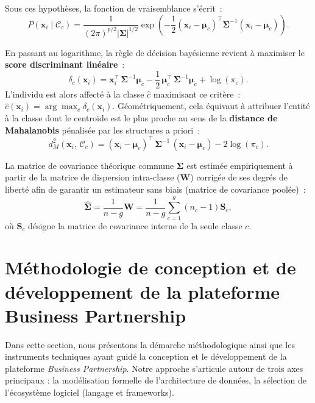 \documentclass[12pt, a4paper, oneside]{report}
\begin{document}
	Sous ces hypothèses, la fonction de vraisemblance s'écrit~:
	\begin{equation}
		P(\mathbf{x}_i \mid \mathcal{C}_c) = \frac{1}{(2\pi)^{p/2}|\boldsymbol{\Sigma}|^{1/2}} \exp\!\left( -\frac{1}{2} (\mathbf{x}_i - \boldsymbol{\mu}_c)^{\top} \boldsymbol{\Sigma}^{-1} (\mathbf{x}_i - \boldsymbol{\mu}_c) \right).
		\label{eq:vraisemblance}
	\end{equation}
	
	En passant au logarithme, la règle de décision bayésienne revient à maximiser le \textbf{score discriminant linéaire}~:
	\begin{equation}
		\delta_c(\mathbf{x}_i) = \mathbf{x}_i^{\top}\,\boldsymbol{\Sigma}^{-1}\boldsymbol{\mu}_c - \frac{1}{2}\,\boldsymbol{\mu}_c^{\top}\,\boldsymbol{\Sigma}^{-1}\boldsymbol{\mu}_c + \log(\pi_c).
		\label{eq:score_bayes}
	\end{equation}
	L'individu est alors affecté à la classe $\hat{c}$ maximisant ce critère~: $\hat{c}(\mathbf{x}_i) = \arg\max_{c} \delta_c(\mathbf{x}_i)$. Géométriquement, cela équivaut à attribuer l'entité à la classe dont le centroïde est le plus proche au sens de la \textbf{distance de Mahalanobis} pénalisée par les structures a priori~:
	\begin{equation}
		d_M^2(\mathbf{x}_i,\, \mathcal{C}_c) = (\mathbf{x}_i - \boldsymbol{\mu}_c)^{\top}\,\boldsymbol{\Sigma}^{-1}\,(\mathbf{x}_i - \boldsymbol{\mu}_c) - 2\log(\pi_c).
		\label{eq:mahalanobis}
	\end{equation}
	
	La matrice de covariance théorique commune $\boldsymbol{\Sigma}$ est estimée empiriquement à partir de la matrice de dispersion intra-classe ($\mathbf{W}$) corrigée de ses degrés de liberté afin de garantir un estimateur sans biais (matrice de covariance poolée)~:
	\begin{equation}
		\hat{\boldsymbol{\Sigma}} = \frac{1}{n - g} \mathbf{W} = \frac{1}{n - g} \sum_{c=1}^{g} (n_c - 1) \mathbf{S}_c,
		\label{eq:sigma_estime}
	\end{equation}
	où $\mathbf{S}_c$ désigne la matrice de covariance interne de la seule classe $c$.
	
	
	
\section{Méthodologie de conception et de développement de la plateforme Business Partnership}
\label{sec:methodologie_dev}
Dans cette section, nous présentons la démarche méthodologique ainsi que les instruments techniques ayant guidé la conception et le développement de la plateforme \textit{Business Partnership}. Notre approche s'articule autour de trois axes principaux : la modélisation formelle de l'architecture de données, la sélection de l'écosystème logiciel (langage et frameworks).
\end{document}
